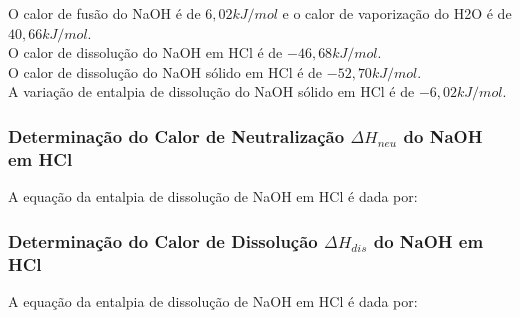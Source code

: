             \indent O calor de fusão do NaOH é de $6,02 kJ/mol$ e o calor de vaporização do H2O é de $40,66 kJ/mol$.\\
            \indent O calor de dissolução do NaOH em HCl é de $- 46,68 kJ/mol$.\\
            \indent O calor de dissolução do NaOH sólido em HCl é de $- 52,70 kJ/mol$.\\
            \indent A variação de entalpia de dissolução do NaOH sólido em HCl é de $- 6,02 kJ/mol$.\\
            
            \subsubsection{Determinação do Calor de Neutralização $\Delta{H_{neu}}$ do NaOH em HCl}\label{sec:determinacao_calor_neutraliza}
            \indent A equação da entalpia de dissolução de NaOH em HCl é dada por:\\
            
            \subsubsection{Determinação do Calor de Dissolução $\Delta{H_{dis}}$ do NaOH em HCl}\label{sec:determinacao_calor_dissolucao}
            \indent A equação da entalpia de dissolução de NaOH em HCl é dada por:\\


